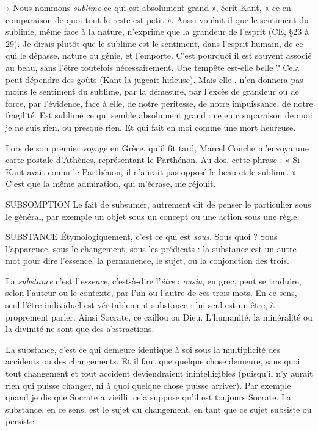 « Nous nommons {\it sublime} ce qui est absolument grand », écrit Kant, « ce en
comparaison de quoi tout le reste est petit ». Aussi voulait-il que le sentiment
du sublime, même face à la nature, n’exprime que la grandeur de l'esprit
(CE, \S 23 à 29). Je dirais plutôt que le sublime est le sentiment, dans l'esprit
humain, de ce qui le dépasse, nature ou génie, et l'emporte. C’est pourquoi il
est souvent associé au beau, sans l’être toutefois nécessairement. Une tempête
est-elle belle ? Cela peut dépendre des goûts (Kant la jugeait hideuse). Mais elle
. n’en donnera pas moins le sentiment du sublime, par la démesure, par l’excès
de grandeur ou de force, par l'évidence, face à elle, de notre peritesse, de notre
impuissance, de notre fragilité. Est sublime ce qui semble absolument grand :
ce en comparaison de quoi je ne suis rien, ou presque rien. Et qui fait en moi
comme une mort heureuse.

Lors de son premier voyage en Grèce, qu’il fit tard, Marcel Conche
m'envoya une carte postale d'Athènes, représentant le Parthénon. Au dos, cette
phrase : « Si Kant avait connu le Parthénon, il n'aurait pas opposé le beau et le
sublime. » C’est que la même admiration, qui m'écrase, me réjouit.

SUBSOMPTION  Le fait de subsumer, autrement dit de penser le particulier
sous le général, par exemple un objet sous un concept ou
une action sous une règle.

SUBSTANCE  Étymologiquement, c’est ce qui est {\it sous}. Sous quoi ? Sous l’apparence,
sous le changement, sous les prédicats : la substance
est un autre mot pour dire l'essence, la permanence, le sujet, ou la conjonction
des trois.

La {\it substance} c’est l'{\it essence}, c’est-à-dire l’{\it être} : {\it ousia}, en grec, peut se traduire,
selon l’auteur ou le contexte, par l’un ou l’autre de ces trois mots. En ce sens,
seul l'être individuel est véritablement substance : lui seul est un être, à proprement
parler. Ainsi Socrate, ce caillou ou Dieu. L’humanité, la minéralité ou la
divinité ne sont que des abstractions.

La substance, c’est ce qui demeure identique à soi sous la multiplicité des
accidents ou des changements. Et il faut que quelque chose demeure, sans quoi
tout changement et tout accident deviendraient inintelligibles (puisqu'il n’y
aurait rien qui puisse changer, ni à quoi quelque chose puisse arriver). Par
exemple quand je dis que Socrate a vieilli: cela suppose qu’il est toujours
Socrate. La substance, en ce sens, est le sujet du changement, en tant que ce
sujet subsiste ou persiste.

